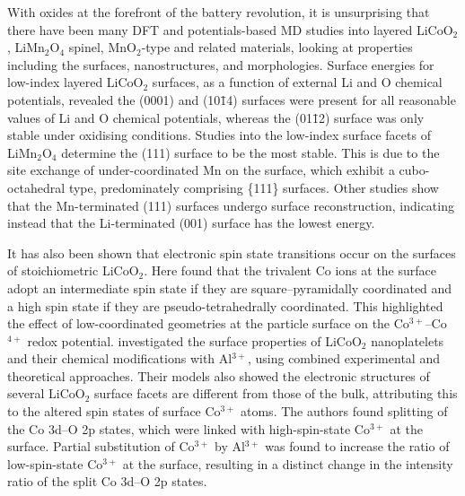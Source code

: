 \documentclass[../main.tex]{subfiles}
\begin{document}
With oxides at the forefront of the battery revolution, it is unsurprising that there have been many DFT and potentials-based MD studies into layered LiCoO$_2$, LiMn$_2$O$_4$ spinel, MnO$_2$-type and related materials, looking at properties including the surfaces, nanostructures, and morphologies.\cite{kramer2009tailoring,xu2011identifying, daheron2009surface,kim2012first,benedek2011simulation,karim2013surface,leung2012first, tompsett2013nanostructuring} Surface energies for low-index layered LiCoO$_2$ surfaces, as a function of external Li and O chemical potentials, revealed the (0001) and (10\={1}4) surfaces were present for all reasonable values of Li and O chemical potentials, whereas the (01\={1}2) surface was only stable under oxidising conditions.\cite{kramer2009tailoring} Studies into the low-index surface facets of LiMn$_2$O$_4$ determine the (111) surface to be the most stable. This is due to the site exchange of under-coordinated Mn on the surface, which exhibit a cubo-octahedral type, predominately comprising \{111\} surfaces. \cite{karim2013surface} Other studies show that the Mn-terminated (111) surfaces undergo surface reconstruction, indicating instead that the Li-terminated (001) surface has the lowest energy.\cite{benedek2011simulation}

It has also been shown that electronic spin state transitions occur on the surfaces of stoichiometric LiCoO$_2$. Here \citeauthor{qian2012electronic} found that the trivalent Co ions at the surface adopt an intermediate spin state if they are square–pyramidally coordinated and a high spin state if they are pseudo-tetrahedrally coordinated. This highlighted the effect of low-coordinated geometries at the particle surface on the Co$^{3+}$–Co$^{4+}$ redox potential.\cite{qian2012electronic} \citeauthor{hong2019electronic} investigated the surface properties of LiCoO$_2$ nanoplatelets and their chemical modifications with Al$^{3+}$, using combined experimental and theoretical approaches.\cite{hong2019electronic} Their models also showed the electronic structures of several LiCoO$_2$ surface facets are different from those of the bulk, attributing this to the altered spin states of surface Co$^{3+}$ atoms. The authors found splitting of the Co 3d–O 2p states, which were linked with high-spin-state Co$^{3+}$ at the surface. Partial substitution of Co$^{3+}$ by Al$^{3+}$ was found to increase the ratio of low-spin-state Co$^{3+}$ at the surface, resulting in a distinct change in the intensity ratio of the split Co 3d–O 2p states. 
\end{document}
